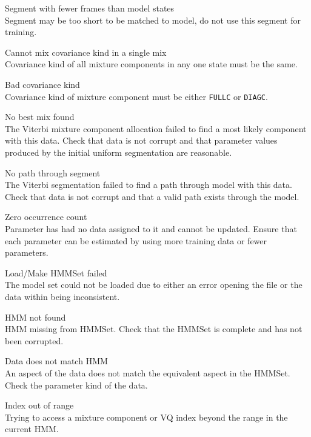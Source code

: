 \begin{itemize}
\begin{itemize}
    Segment with fewer frames than model states\\
        Segment may be too short to be matched to model, do not use
        this segment for training.

    Cannot mix covariance kind in a single mix\\
        Covariance kind of all mixture components in any one state must be
        the same.

    Bad covariance kind\\
        Covariance kind of mixture component must be either
        \texttt{FULLC} or \texttt{DIAGC}.

    No best mix found\\
        The Viterbi mixture component allocation failed to find a most likely
        component with this data.  Check that data is not corrupt and
        that parameter values produced by the initial uniform segmentation
        are reasonable.

    No path through segment\\
        The Viterbi segmentation failed to find a path through
        model with this data.  Check that data is not corrupt and that
        a valid path exists through the model.

    Zero occurrence count\\
        Parameter has had no data assigned to it and cannot be
        updated.  Ensure that each parameter can be estimated by
        using more training data or fewer parameters.

    Load/Make HMMSet failed\\
        The model set could not be loaded due to either an error opening the
        file or the data within being inconsistent.

    HMM not found\\
        HMM missing from HMMSet.  Check that the HMMSet is complete and 
        has not been corrupted.

    Data does not match HMM\\
        An aspect of the data does not match the equivalent aspect in 
        the HMMSet.  Check the parameter kind of the data.

    Index out of range\\
        Trying to access a mixture component or VQ index beyond the
        range in the current HMM.


\end{itemize}
\end{itemize}
